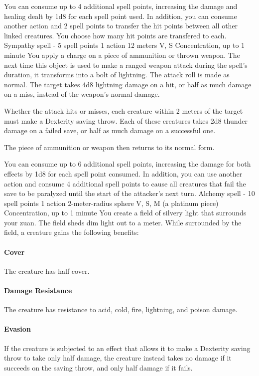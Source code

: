     You can consume up to 4 additional spell points, increasing the damage and healing dealt by 1d8 for each spell point used.
    In addition, you can consume another action and 2 spell points to transfer the hit points between all other linked creatures.
    You choose how many hit points are transfered to each.
    {Sympathy spell - 5 spell points}
    {1 action}
    {12 meters}
    {V, S}
    {Concentration, up to 1 minute}
    You apply a charge on a piece of ammunition or thrown weapon.
    The next time this object is used to make a ranged weapon attack during the spell's duration, it transforms into a bolt of lightning.
    The attack roll is made as normal.
    The target takes 4d8 lightning damage on a hit, or half as much damage on a miss, instead of the weapon's normal damage.

    Whether the attack hits or misses, each creature within 2 meters of the target must make a Dexterity saving throw.
    Each of these creatures takes 2d8 thunder damage on a failed save, or half as much damage on a successful one.

    The piece of ammunition or weapon then returns to its normal form.

    You can consume up to 6 additional spell points, increasing the damage for both effects by 1d8 for each spell point consumed.
    In addition, you can use another action and consume 4 additional spell points to cause all creatures that fail the save to be paralyzed until the start of the attacker's next turn.
    {Alchemy spell - 10 spell points}
    {1 action}
    {2-meter-radius sphere}
    {V, S, M (a platinum piece)}
    {Concentration, up to 1 minute}
    You create a field of silvery light that surrounds your zuan.
    The field sheds dim light out to a meter.
    While surrounded by the field, a creature gains the following benefits:

    \paragraph{Cover}
    The creature has half cover.
    \paragraph{Damage Resistance}
    The creature has resistance to acid, cold, fire, lightning, and poison damage.
    \paragraph{Evasion}
    If the creature is subjected to an effect that allows it to make a Dexterity saving throw to take only half damage, the creature instead takes no damage if it succeeds on the saving throw, and only half damage if it fails.

